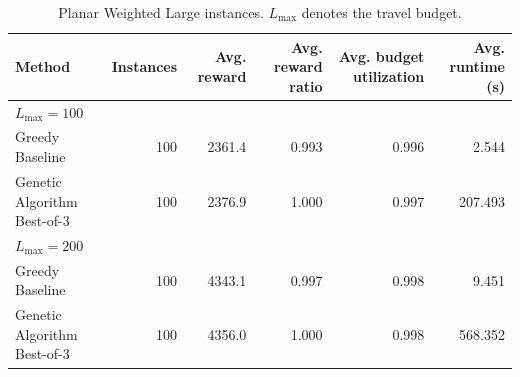 \begin{table}[ht]
\centering
\caption{Planar Weighted Large instances. $L_{\max}$ denotes the travel budget.}
\begin{tabular}{lrrrrr}
\toprule
Method & Instances & Avg. reward & Avg. reward ratio & Avg. budget utilization & Avg. runtime (s) \\
\midrule
\multicolumn{6}{l}{$L_{\max}=100$} \\
Greedy Baseline & 100 & 2361.4 & 0.993 & 0.996 & 2.544 \\
Genetic Algorithm Best-of-3 & 100 & 2376.9 & 1.000 & 0.997 & 207.493 \\
\multicolumn{6}{l}{$L_{\max}=200$} \\
Greedy Baseline & 100 & 4343.1 & 0.997 & 0.998 & 9.451 \\
Genetic Algorithm Best-of-3 & 100 & 4356.0 & 1.000 & 0.998 & 568.352 \\
\bottomrule
\end{tabular}
\label{tab:planar-weighted-large-ttsp-results}
\end{table}
